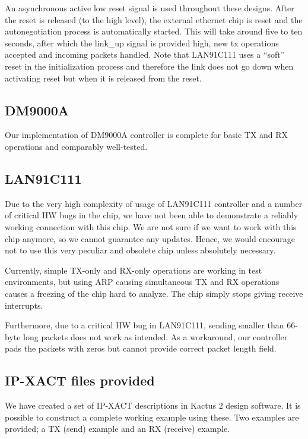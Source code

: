 \documentclass[a4paper,10pt,oneside,final]{article}
\begin{document}
An asynchronous active low reset signal is used throughout these
designs. After the reset is released (to the high level), the external
ethernet chip is reset and the autonegotiation process is
automatically started. This will take around five to ten seconds, after
which the link\_up signal is provided high, new tx operations accepted
and incoming packets handled. Note that LAN91C111 uses a ``soft'' reset
in the initialization process and therefore the link does not go down
when activating reset but when it is released from the reset.

\subsection{DM9000A}

Our implementation of DM9000A controller is complete for basic TX and RX
operations and comparably well-tested.

\subsection{LAN91C111}
\label{sec:LAN91C111}

Due to the very high complexity of usage of LAN91C111 controller and a
number of critical HW bugs in the chip, we have not been able to
demonstrate a reliably working connection with this chip. We are not
sure if we want to work with this chip anymore, so we cannot guarantee
any updates. Hence, we would encourage not to use this very peculiar
and obsolete chip unless absolutely necessary.

Currently, simple TX-only and RX-only operations are working in test
environments, but using ARP causing simultaneous TX and RX operations
causes a freezing of the chip hard to analyze. The chip simply stops
giving receive interrupts.

Furthermore, due to a critical HW bug in LAN91C111, sending smaller than
66-byte long packets does not work as intended. As a workaround, our controller
pads the packets with zeros but cannot provide correct packet length field.

\subsection{IP-XACT files provided}

We have created a set of IP-XACT descriptions in Kactus 2 design software.
It is possible to construct a complete working example using these. Two
examples are provided; a TX (send) example and an RX (receive) example.
\end{document}
